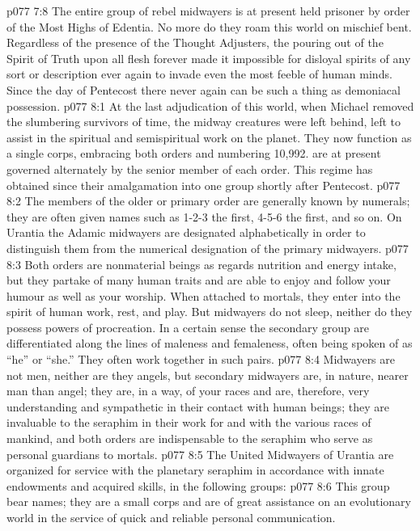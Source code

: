 \vs p077 7:8 The entire group of rebel midwayers is at present held prisoner by order of the Most Highs of Edentia. No more do they roam this world on mischief bent. Regardless of the presence of the Thought Adjusters, the pouring out of the Spirit of Truth upon all flesh forever made it impossible for disloyal spirits of any sort or description ever again to invade even the most feeble of human minds. Since the day of Pentecost there never again can be such a thing as demoniacal possession.
\vs p077 8:1 At the last adjudication of this world, when Michael removed the slumbering survivors of time, the midway creatures were left behind, left to assist in the spiritual and semispiritual work on the planet. They now function as a single corps, embracing both orders and numbering 10,992.  are at present governed alternately by the senior member of each order. This regime has obtained since their amalgamation into one group shortly after Pentecost.
\vs p077 8:2 The members of the older or primary order are generally known by numerals; they are often given names such as 1\hyp{}2\hyp{}3 the first, 4\hyp{}5\hyp{}6 the first, and so on. On Urantia the Adamic midwayers are designated alphabetically in order to distinguish them from the numerical designation of the primary midwayers.
\vs p077 8:3 Both orders are nonmaterial beings as regards nutrition and energy intake, but they partake of many human traits and are able to enjoy and follow your humour as well as your worship. When attached to mortals, they enter into the spirit of human work, rest, and play. But midwayers do not sleep, neither do they possess powers of procreation. In a certain sense the secondary group are differentiated along the lines of maleness and femaleness, often being spoken of as “he” or “she.” They often work together in such pairs.
\vs p077 8:4 Midwayers are not men, neither are they angels, but secondary midwayers are, in nature, nearer man than angel; they are, in a way, of your races and are, therefore, very understanding and sympathetic in their contact with human beings; they are invaluable to the seraphim in their work for and with the various races of mankind, and both orders are indispensable to the seraphim who serve as personal guardians to mortals.
\vs p077 8:5 \pc The United Midwayers of Urantia are organized for service with the planetary seraphim in accordance with innate endowments and acquired skills, in the following groups:
\vs p077 8:6 \bibnobreakspace {} This group bear names; they are a small corps and are of great assistance on an evolutionary world in the service of quick and reliable personal communication.
